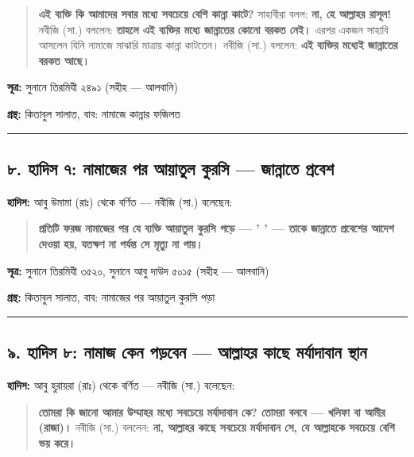 \begin{quote}
\textbf{এই ব্যক্তি কি আমাদের সবার মধ্যে সবচেয়ে বেশি কান্না কাটে?} সাহাবীরা বলল: \textbf{না, হে আল্লাহর রাসূল!} নবীজি (সা.) বললেন: \textbf{তাহলে এই ব্যক্তির মধ্যে জান্নাতের কোনো বরকত নেই।} এরপর একজন সাহাবি আসলেন যিনি নামাজে মাঝারি মাত্রায় কান্না কাটতেন। নবীজি (সা.) বললেন: \textbf{এই ব্যক্তির মধ্যেই জান্নাতের বরকত আছে।}
\end{quote}

\textbf{সূত্র:} সুনানে তিরমিযী ২৪৯১ (সহীহ — আলবানি)

\textbf{গ্রন্থ:} কিতাবুল সালাত, বাব: নামাজে কান্নার ফজিলত

\medskip\hrule\medskip

\subsection*{৮. হাদিস ৭: নামাজের পর আয়াতুল কুরসি — জান্নাতে প্রবেশ}

\textbf{হাদিস:} আবু উমামা (রাঃ) থেকে বর্ণিত — নবীজি (সা.) বলেছেন:

\begin{quote}
\textbf{প্রতিটি ফরজ নামাজের পর যে ব্যক্তি আয়াতুল কুরসি পড়ে — '      ' — তাকে জান্নাতে প্রবেশের আদেশ দেওয়া হয়, যতক্ষণ না পর্যন্ত সে মৃত্যু না পায়।}
\end{quote}

\textbf{সূত্র:} সুনানে তিরমিযী ৩৫২০, সুনানে আবু দাউদ ৫০১৫ (সহীহ — আলবানি)

\textbf{গ্রন্থ:} কিতাবুল সালাত, বাব: নামাজের পর আয়াতুল কুরসি পড়া

\medskip\hrule\medskip

\subsection*{৯. হাদিস ৮: নামাজ কেন পড়বেন — আল্লাহর কাছে মর্যাদাবান স্থান}

\textbf{হাদিস:} আবু হুরায়রা (রাঃ) থেকে বর্ণিত — নবীজি (সা.) বলেছেন:

\begin{quote}
\textbf{তোমরা কি জানো আমার উম্মাহর মধ্যে সবচেয়ে মর্যাদাবান কে? তোমরা বলবে — খলিফা বা আমীর (রাজা)।} নবীজি (সা.) বললেন: \textbf{না, আল্লাহর কাছে সবচেয়ে মর্যাদাবান সে, যে আল্লাহকে সবচেয়ে বেশি ভয় করে।}
\end{quote}

